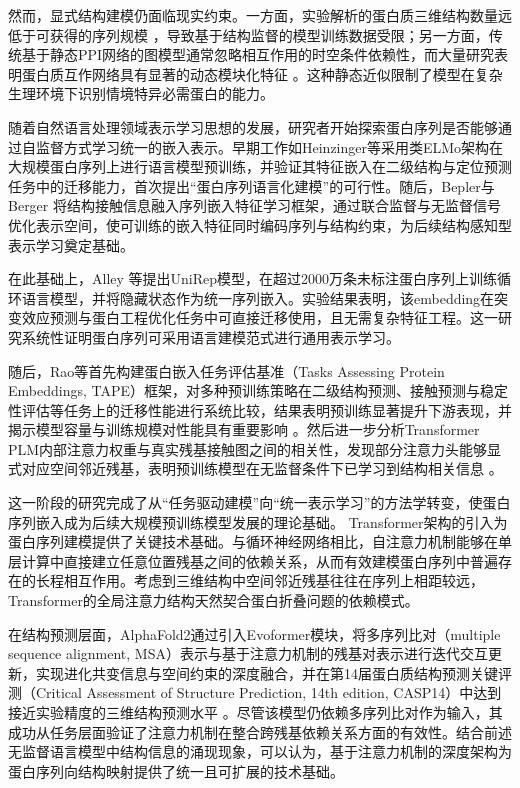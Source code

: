 然而，显式结构建模仍面临现实约束。一方面，实验解析的蛋白质三维结构数量远低于可获得的序列规模 \cite{consortium2019protein}，导致基于结构监督的模型训练数据受限；另一方面，传统基于静态PPI网络的图模型通常忽略相互作用的时空条件依赖性，而大量研究表明蛋白质互作网络具有显著的动态模块化特征 \cite{han2004evidence}。这种静态近似限制了模型在复杂生理环境下识别情境特异必需蛋白的能力。

随着自然语言处理领域表示学习思想的发展，研究者开始探索蛋白序列是否能够通过自监督方式学习统一的嵌入表示。早期工作如Heinzinger等\cite{heinzinger2019modeling}采用类ELMo架构在大规模蛋白序列上进行语言模型预训练，并验证其特征嵌入在二级结构与定位预测任务中的迁移能力，首次提出“蛋白序列语言化建模”的可行性。随后，Bepler与Berger\cite{bepler2019learning} 将结构接触信息融入序列嵌入特征学习框架，通过联合监督与无监督信号优化表示空间，使可训练的嵌入特征同时编码序列与结构约束，为后续结构感知型表示学习奠定基础。

在此基础上，Alley\cite{alley2019unified} 等提出UniRep模型，在超过2000万条未标注蛋白序列上训练循环语言模型，并将隐藏状态作为统一序列嵌入。实验结果表明，该embedding在突变效应预测与蛋白工程优化任务中可直接迁移使用，且无需复杂特征工程。这一研究系统性证明蛋白序列可采用语言建模范式进行通用表示学习。

随后，Rao等首先构建蛋白嵌入任务评估基准（Tasks Assessing Protein Embeddings, TAPE）框架，对多种预训练策略在二级结构预测、接触预测与稳定性评估等任务上的迁移性能进行系统比较，结果表明预训练显著提升下游表现，并揭示模型容量与训练规模对性能具有重要影响 \cite{rao2019evaluating}。然后进一步分析Transformer PLM内部注意力权重与真实残基接触图之间的相关性，发现部分注意力头能够显式对应空间邻近残基，表明预训练模型在无监督条件下已学习到结构相关信息 \cite{rao2021transformer}。

这一阶段的研究完成了从“任务驱动建模”向“统一表示学习”的方法学转变，使蛋白序列嵌入成为后续大规模预训练模型发展的理论基础。
Transformer架构的引入为蛋白序列建模提供了关键技术基础\cite{vaswani2017attention}。与循环神经网络相比，自注意力机制能够在单层计算中直接建立任意位置残基之间的依赖关系，从而有效建模蛋白序列中普遍存在的长程相互作用。考虑到三维结构中空间邻近残基往往在序列上相距较远，Transformer的全局注意力结构天然契合蛋白折叠问题的依赖模式。

在结构预测层面，AlphaFold2通过引入Evoformer模块，将多序列比对（multiple sequence alignment, MSA）表示与基于注意力机制的残基对表示进行迭代交互更新，实现进化共变信息与空间约束的深度融合，并在第14届蛋白质结构预测关键评测（Critical Assessment of Structure Prediction, 14th edition, CASP14）中达到接近实验精度的三维结构预测水平 \cite{jumper2021highly}。尽管该模型仍依赖多序列比对作为输入，其成功从任务层面验证了注意力机制在整合跨残基依赖关系方面的有效性。结合前述无监督语言模型中结构信息的涌现现象，可以认为，基于注意力机制的深度架构为蛋白序列向结构映射提供了统一且可扩展的技术基础。

